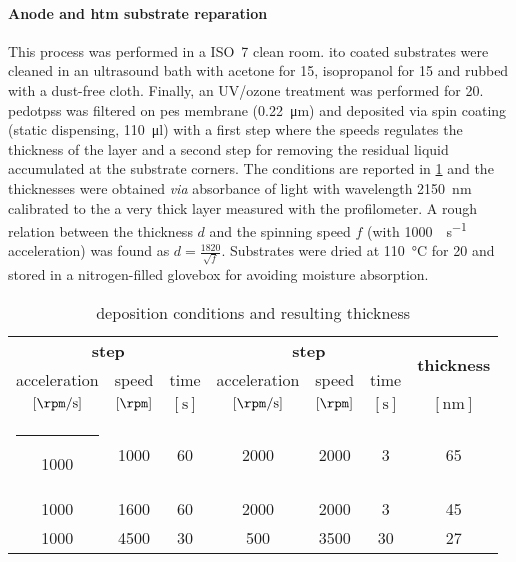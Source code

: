 		\paragraph{Anode and \gls{htm} substrate reparation}
		This process was performed in a ISO~7 clean room.
		\Gls{ito} coated substrates were cleaned in an ultrasound bath with acetone for \SI{15}{\min}, isopropanol for \SI{15}{\min} and rubbed with a dust-free cloth.
		Finally, an UV/ozone treatment was performed for \SI{20}{\min}.
		\Gls{pedotpss} was filtered on \gls{pes} membrane (\SI{0.22}{\um})
		and deposited via spin coating (static dispensing, \SI{110}{\ul}) with a first step where the speeds regulates the thickness of the layer and a second step for removing the residual liquid accumulated at the substrate corners.
		The conditions are reported in \cref{pedotpss_thickness} and the thicknesses were obtained \textit{via} absorbance of light with wavelength \SI{2150}{\nm} calibrated to the a very thick layer measured with the profilometer.
		A rough relation between the thickness $d$ and the spinning speed $f$ (with \SI{1000}{\rpm\per\s} acceleration) was found as $d = \frac{1820}{\sqrt{f}}$.
		Substrates were dried at \SI{110}{\celsius} for \SI{20}{\min} and stored in a nitrogen-filled glovebox for avoiding moisture absorption.

		\begin{table}%
			\caption{ deposition conditions and resulting thickness}\label{pedotpss_thickness}
			\begin{center}
				\begin{tabular}{c c c | c c c | c}
					\multicolumn{3}{c|}{\textbf{\nth{1} step}} & \multicolumn{3}{c|}{\textbf{\nth{2} step}} & \multirow{2}{*}{\textbf{thickness}}                                                                    \\
					acceleration                               & speed                                      & time                                & acceleration        & speed         & time        &              \\
					$[\si{\rpm\per\s}]$                        & $[\si{\rpm}]$                              & $[\si{\s}]$                         & $[\si{\rpm\per\s}]$ & $[\si{\rpm}]$ & $[\si{\s}]$ & $[\si{\nm}]$ \\[1mm]
					\hline
					\rule[0ex]{-4pt}{3ex}
					1000                                       & 1000                                       & 60                                  & 2000                & 2000          & 3           & 65           \\
					1000                                       & 1600                                       & 60                                  & 2000                & 2000          & 3           & 45           \\
					1000                                       & 4500                                       & 30                                  & 500                 & 3500          & 30          & 27           \\
				\end{tabular}
			\end{center}
		\end{table}

